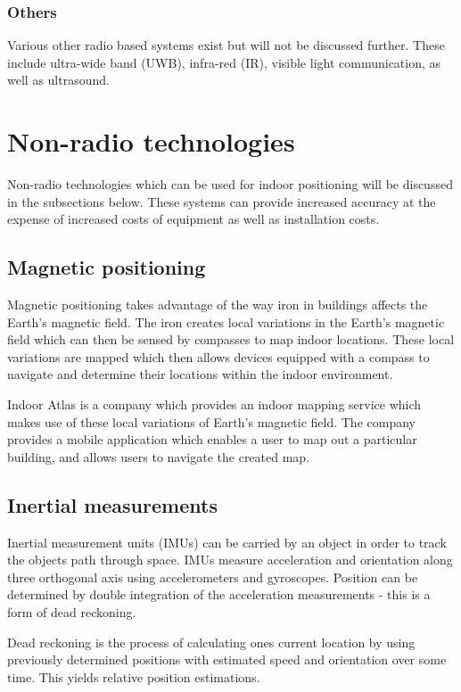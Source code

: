 \documentclass[11pt,a4paper]{report}
\begin{document}
		\subsubsection{Others}
			Various other radio based systems exist but will not be discussed further. These include ultra-wide band (UWB), infra-red (IR), visible light communication, as well as ultrasound.
	
	\section{Non-radio technologies}
		Non-radio technologies which can be used for indoor positioning will be discussed in the subsections below. These systems can provide increased accuracy at the expense of increased costs of equipment as well as installation costs.
	
	\subsection{Magnetic positioning}
		Magnetic positioning takes advantage of the way iron in buildings affects the Earth's magnetic field. The iron creates local variations in the Earth's magnetic field which can then be sensed by compasses to map indoor locations. These local variations are mapped which then allows devices equipped with a compass to navigate and determine their locations within the indoor environment.
		\cite{supreeth_sudhakaran_geospatial_2014}
		
		Indoor Atlas is a company which provides an indoor mapping service which makes use of these local variations of Earth's magnetic field. The company provides a mobile application which enables a user to map out a particular building, and allows users to navigate the created map.
	
	\subsection{Inertial measurements}
		Inertial measurement units (IMUs) can be carried by an object in order to track the objects path through space. IMUs measure acceleration and orientation along three orthogonal axis using accelerometers and gyroscopes. Position can be determined by double integration of the acceleration measurements - this is a form of dead reckoning.
		
		Dead reckoning is the process of calculating ones current location by using previously determined positions with estimated speed and orientation over some time. This yields relative position estimations. 
		
\end{document}
